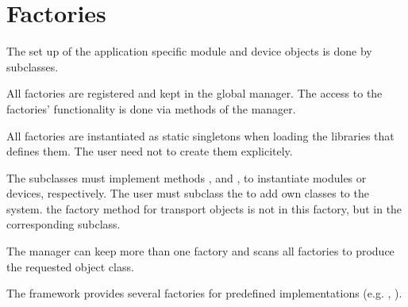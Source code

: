 \section{Factories}
The set up of the application specific module and device objects is done 
   by  subclasses.
\begin{compactitem}[$\circ$]
\item  All factories are registered and kept in the global manager. 
      The access to the factories' functionality is done via methods of the manager. 
\item  All factories are instantiated as static singletons when 
      loading the libraries that defines them. 
      The user need not to create them explicitely.       
\item  The  subclasses must implement methods , 
      and  , to instantiate modules or 
      devices, respectively. The user must subclass 
      the  to add own classes to the system.  the factory 
      method for transport objects is not in this factory, but in the 
      corresponding  subclass. 
\item  The manager can keep more than one factory and scans 
      all factories to produce the requested object class. 
\item  The framework provides several factories for predefined 
      implementations (e.g. , ).      
\end{compactitem}


